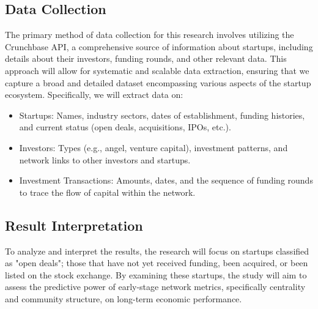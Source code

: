 \documentclass[a4paper,11pt]{article}
\begin{document}
\subsection{Data Collection}
The primary method of data collection for this research involves utilizing the Crunchbase API, a comprehensive source of information about startups, including details about their investors, funding rounds, and other relevant data. This approach will allow for systematic and scalable data extraction, ensuring that we capture a broad and detailed dataset encompassing various aspects of the startup ecosystem. Specifically, we will extract data on:
\begin{itemize}
    \item Startups: Names, industry sectors, dates of establishment, funding histories, and current status (open deals, acquisitions, IPOs, etc.).
    \item Investors: Types (e.g., angel, venture capital), investment patterns, and network links to other investors and startups.
    \item Investment Transactions: Amounts, dates, and the sequence of funding rounds to trace the flow of capital within the network.
\end{itemize}

\subsection{Result Interpretation}
To analyze and interpret the results, the research will focus on startups classified as "open deals"; those that have not yet received funding, been acquired, or been listed on the stock exchange. By examining these startups, the study will aim to assess the predictive power of early-stage network metrics, specifically centrality and community structure, on long-term economic performance.
\end{document}
